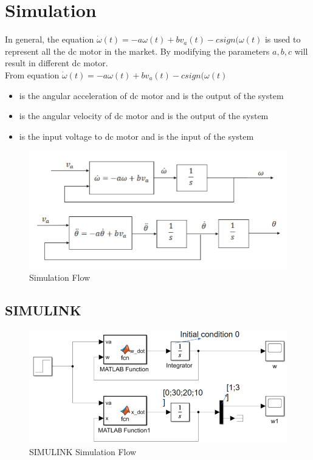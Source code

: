 \documentclass[12pt,a4paper]{article}
\begin{document}
	\section{Simulation}
	
	In general, the equation \(\dot{\omega}(t) = - a\omega(t) + bv_a(t) - csign(\omega(t)\) is used to represent all the dc motor in the market. By modifying the parameters \(a, b, c\) will result in different dc motor.\\
	
	From equation \(\dot{\omega}(t) = - a\omega(t) + bv_a(t) - csign(\omega(t)\)
	\begin{itemize}
		\item { is the angular acceleration of dc motor and is the output of the system}
		\item { is the angular velocity of dc motor and is the output of the system}
		\item { is the input voltage to dc motor and is the input of the system}
	\end{itemize}
	
	\begin{figure}[ht]
		\centering
		\includegraphics[scale=1]{src/img/fig3.pdf}
		\caption{Simulation Flow}
		\label{fig:Simulation Flow}
	\end{figure}
	\break
	\subsection{SIMULINK}
	
	\begin{figure}[ht]
		\centering
		\includegraphics[scale=1]{src/img/fig4.pdf}
		\caption{SIMULINK Simulation Flow}
		\label{fig:SIMULINK Simulation Flow}
	\end{figure}
\end{document}
